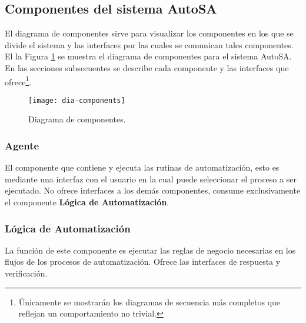 \subsection{Componentes del sistema AutoSA}
El diagrama de componentes sirve para visualizar los componentes en los que se divide el sistema y las interfaces por las cuales se comunican tales componentes. El la Figura \ref{fig:dia-components} se muestra el diagrama de componentes para el sistema AutoSA. En las secciones subsecuentes se describe cada componente y las interfaces que ofrece\footnote{Únicamente se mostrarán los diagramas de secuencia más completos que reflejan un comportamiento no trivial.}.
\begin{figure}[h]
\centering
\texttt{[image: dia-components]}
\caption{Diagrama de componentes.}
\label{fig:dia-components}
\end{figure}
\subsubsection{Agente}
El componente que contiene y ejecuta las rutinas de automatización, esto es mediante una interfaz con el usuario en la cual puede seleccionar el proceso a ser ejecutado. No ofrece interfaces a los demás componentes, consume exclusivamente el componente \textbf{Lógica de Automatización}.
\subsubsection{Lógica de Automatización}\label{sec:logica-auto}
La función de este componente es ejecutar las reglas de negocio necesarias en los flujos de los procesos de automatización. Ofrece las interfaces de respuesta y verificación.

